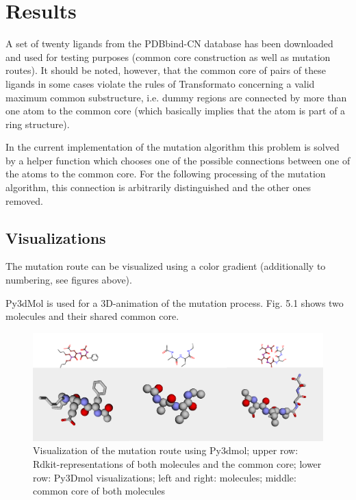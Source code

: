 \chapter{Results}

A set of twenty ligands from the PDBbind-CN database has been downloaded and used for testing
purposes (common core construction as well as mutation routes). It
should be noted, however, that the common core of pairs of these ligands
in some cases violate the rules of Transformato concerning a valid
maximum common substructure, i.e. dummy regions are connected by more
than one atom to the common core (which basically implies that the
atom is part of a ring structure). 

In the current implementation of the mutation algorithm this problem
is solved by a helper function which chooses one of the possible connections
between one of the atoms to the common core. For the following processing
of the mutation algorithm, this connection is arbitrarily distinguished
and the other ones removed. 


\section{Visualizations}

The mutation route can be visualized using a color gradient (additionally
to numbering, see figures above).

Py3dMol is used for a 3D-animation of the mutation process. Fig. 5.1
shows two molecules and their shared common core.

\begin{figure}
\includegraphics[scale=0.35]{trafo_py3d_1verkleinert}

\caption{Visualization of the mutation route using Py3dmol; upper row: Rdkit-representations
of both molecules and the common core; lower row: Py3Dmol visualizations;
left and right: molecules; middle: common core of both molecules}

\end{figure}


